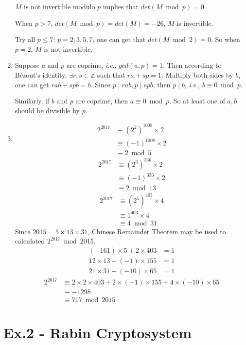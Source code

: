 \documentclass[12pt]{article}
\newcommand{\ie}{\textit{i}.\textit{e}.}
\begin{document}
\begin{enumerate}
	$M$ is not invertible modulo $p$ implies that $det(M \bmod p) = 0$.

	When $p > 7$, $det(M \bmod p) = det(M) = -26$, $M$ is invertible.

	Try all $p \le 7$: $p = 2, 3, 5, 7$, one can get that $det(M \bmod 2) = 0$. So when $p = 2$, $M$ is not invertible.
	\item Suppose $a$ and $p$ are coprime, \ie, $gcd(a, p) = 1$. Then according to Bézout's identity, $\exists r, s \in \mathbb{Z}$ such that $ra + sp = 1$. Multiply both sides by $b$, one can get $rab + spb = b$. Since $p \mid rab, p \mid spb$, then $p \mid b$, \ie, $b \equiv 0 \bmod p$.

	Similarly, if $b$ and $p$ are coprime, then $a \equiv 0 \bmod p$. So at least one of $a, b$ should be divisible by $p$.
	\item 
	\begin{align*}
		2^{2017} &\equiv (2^2)^{1008} \times 2\\
		&\equiv (-1)^{1008} \times 2\\
		&\equiv 2 \bmod 5
	\end{align*}
	\begin{align*}
		2^{2017} &\equiv (2^6)^{336} \times 2\\
		&\equiv (-1)^{336} \times 2\\
		&\equiv 2 \bmod 13
	\end{align*}
	\begin{align*}
		2^{2017} &\equiv (2^5)^{403} \times 4\\
		&\equiv 1^{403} \times 4\\
		&\equiv 4 \bmod 31
	\end{align*}
	Since $2015 = 5 \times 13 \times 31$, Chinese Remainder Theorem may be used to calculated $2^{2017} \bmod 2015$.
	\begin{align*}
		(-161) \times 5 + 2 \times 403 &= 1\\
		12 \times 13 + (-1) \times 155 &= 1\\
		21 \times 31 + (-10) \times 65 &= 1
	\end{align*}
	\begin{align*}
		2^{2017} &\equiv 2 \times 2 \times 403 + 2 \times (-1) \times 155 + 4 \times (-10) \times 65\\
		&\equiv -1298\\
		&\equiv 717 \bmod 2015
	\end{align*}
\end{enumerate}

\section*{Ex.2 - Rabin Cryptosystem}
\end{document}
